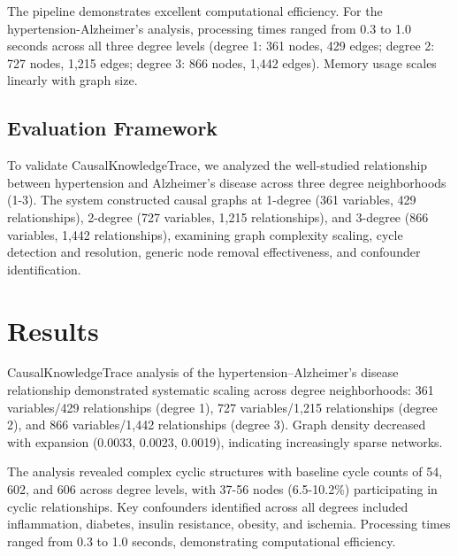 \documentclass[preprint,12pt,numbers,sort&compress]{elsarticle}
\begin{document}
The pipeline demonstrates excellent computational efficiency. For the hypertension-Alzheimer's analysis, processing times ranged from 0.3 to 1.0 seconds across all three degree levels (degree 1: 361 nodes, 429 edges; degree 2: 727 nodes, 1,215 edges; degree 3: 866 nodes, 1,442 edges). Memory usage scales linearly with graph size.


\subsection{Evaluation Framework}

To validate CausalKnowledgeTrace, we analyzed the well-studied relationship between hypertension and Alzheimer's disease across three degree neighborhoods (1-3). The system constructed causal graphs at 1-degree (361 variables, 429 relationships), 2-degree (727 variables, 1,215 relationships), and 3-degree (866 variables, 1,442 relationships), examining graph complexity scaling, cycle detection and resolution, generic node removal effectiveness, and confounder identification.

\section{Results}
\label{sec:results}

CausalKnowledgeTrace analysis of the hypertension–Alzheimer's disease relationship demonstrated systematic scaling across degree neighborhoods: 361 variables/429 relationships (degree 1), 727 variables/1,215 relationships (degree 2), and 866 variables/1,442 relationships (degree 3). Graph density decreased with expansion (0.0033, 0.0023, 0.0019), indicating increasingly sparse networks.

The analysis revealed complex cyclic structures with baseline cycle counts of 54, 602, and 606 across degree levels, with 37-56 nodes (6.5-10.2\%) participating in cyclic relationships. Key confounders identified across all degrees included inflammation, diabetes, insulin resistance, obesity, and ischemia. Processing times ranged from 0.3 to 1.0 seconds, demonstrating computational efficiency.
\end{document}
